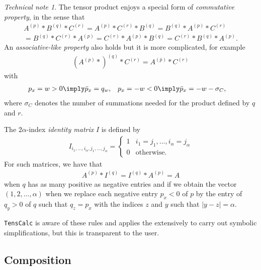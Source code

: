 \documentclass[11pt]{article}
\newcommand{\TC}{\texttt{TensCalc}}
\theoremstyle{remark}
\newtheorem{technical}{Technical note}
\begin{document}
\begin{technical}
  The tensor product enjoys a special form of \emph{commutative
    property}, in the sense that
  \begin{multline*}
    A^{(p)} * B^{(q)} * C^{(r)}
    = A^{(p)} * C^{(r)} * B^{(q)}
    = B^{(q)} * A^{(p)} * C^{(r)}\\
    = B^{(q)} * C^{(r)} * A^{(p)}
    = C^{(r)} * A^{(p)} * B^{(q)}
    = C^{(r)} * B^{(q)} * A^{(p)}.
  \end{multline*}
  An \emph{associative-like property} also holds but it is more
  complicated, for example
  \begin{align*}
    (A^{(p)} *)^{(q)} * C^{(r)}= A^{(\bar p)} * C^{(r)}
  \end{align*}
  with 
  \begin{align*}
    p_x=w>0 &\imply \bar p_x=q_w, &
    p_x=-w<0 &\imply \bar p_x=-w-\sigma_C,
  \end{align*}
  where $\sigma_C$ denotes the number of summations needed for the product
  defined by $q$ and $r$. 

  \medskip

  The $2\alpha$-index \emph{identity matrix} $I$ is defined by
  \begin{align*}
    I_{i_1,\dots,i_\alpha,j_1,\dots,j_\alpha}=
    \begin{cases}
      1 & i_1=j_1,\dots,i_\alpha=j_\alpha\\
      0 & \text{otherwise}.
    \end{cases}
  \end{align*}
  For such matrices, we have that
  \begin{align*}
    A^{(p)} * I^{(q)} = I^{(q)} *  A^{(p)} =A
  \end{align*}
  when $q$ has as many positive as negative entries and if we obtain
  the vector $(1,2,\dots,\alpha)$ when we replace each negative entry $p_x<0$
  of $p$ by the entry of $q_y>0$ of $q$ such that $q_z=p_x$ with the
  indices $z$ and $y$ such that $|y-z|=\alpha$. 

  \medskip

  \TC{} is aware of these rules and applies the extensively to carry
  out symbolic simplifications, but this is transparent to the user.  \frqed
\end{technical}

\subsection{Composition}
\end{document}
